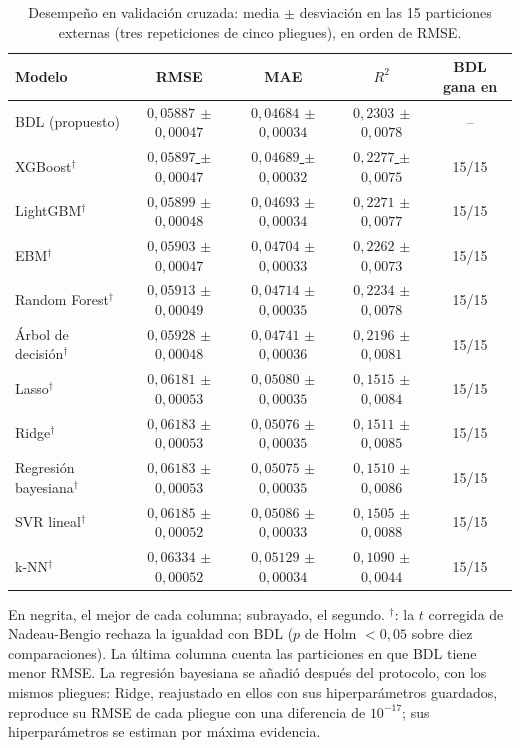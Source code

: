 \begin{table}[tbp]
  \centering\scriptsize\setlength{\tabcolsep}{4pt}
  \caption{Desempeño en validación cruzada: media $\pm$ desviación en las 15 particiones externas (tres repeticiones de cinco pliegues), en orden de RMSE.}
  \label{tab:desempeno}
  \begin{tabular}{lcccc}
    \toprule
    Modelo & RMSE & MAE & $R^2$ & BDL gana en \\
    \midrule
    BDL (propuesto) & {\boldmath\textbf{$0{,}05887$ $\pm$ $0{,}00047$}} & {\boldmath\textbf{$0{,}04684$ $\pm$ $0{,}00034$}} & {\boldmath\textbf{$0{,}2303$ $\pm$ $0{,}0078$}} & -- \\
    XGBoost$^\dagger$ & \underline{$0{,}05897$ $\pm$ $0{,}00047$} & \underline{$0{,}04689$ $\pm$ $0{,}00032$} & \underline{$0{,}2277$ $\pm$ $0{,}0075$} & 15/15 \\
    LightGBM$^\dagger$ & $0{,}05899$ $\pm$ $0{,}00048$ & $0{,}04693$ $\pm$ $0{,}00034$ & $0{,}2271$ $\pm$ $0{,}0077$ & 15/15 \\
    EBM$^\dagger$ & $0{,}05903$ $\pm$ $0{,}00047$ & $0{,}04704$ $\pm$ $0{,}00033$ & $0{,}2262$ $\pm$ $0{,}0073$ & 15/15 \\
    Random Forest$^\dagger$ & $0{,}05913$ $\pm$ $0{,}00049$ & $0{,}04714$ $\pm$ $0{,}00035$ & $0{,}2234$ $\pm$ $0{,}0078$ & 15/15 \\
    Árbol de decisión$^\dagger$ & $0{,}05928$ $\pm$ $0{,}00048$ & $0{,}04741$ $\pm$ $0{,}00036$ & $0{,}2196$ $\pm$ $0{,}0081$ & 15/15 \\
    Lasso$^\dagger$ & $0{,}06181$ $\pm$ $0{,}00053$ & $0{,}05080$ $\pm$ $0{,}00035$ & $0{,}1515$ $\pm$ $0{,}0084$ & 15/15 \\
    Ridge$^\dagger$ & $0{,}06183$ $\pm$ $0{,}00053$ & $0{,}05076$ $\pm$ $0{,}00035$ & $0{,}1511$ $\pm$ $0{,}0085$ & 15/15 \\
    Regresión bayesiana$^\dagger$ & $0{,}06183$ $\pm$ $0{,}00053$ & $0{,}05075$ $\pm$ $0{,}00035$ & $0{,}1510$ $\pm$ $0{,}0086$ & 15/15 \\
    SVR lineal$^\dagger$ & $0{,}06185$ $\pm$ $0{,}00052$ & $0{,}05086$ $\pm$ $0{,}00033$ & $0{,}1505$ $\pm$ $0{,}0088$ & 15/15 \\
    k-NN$^\dagger$ & $0{,}06334$ $\pm$ $0{,}00052$ & $0{,}05129$ $\pm$ $0{,}00034$ & $0{,}1090$ $\pm$ $0{,}0044$ & 15/15 \\
    \bottomrule
  \end{tabular}
  \par\smallskip\begin{minipage}{0.97\linewidth}\scriptsize En negrita, el mejor de cada columna; subrayado, el segundo. $^\dagger$: la $t$ corregida de Nadeau-Bengio rechaza la igualdad con BDL ($p$ de Holm $<0{,}05$ sobre diez comparaciones). La última columna cuenta las particiones en que BDL tiene menor RMSE. La regresión bayesiana se añadió después del protocolo, con los mismos pliegues: Ridge, reajustado en ellos con sus hiperparámetros guardados, reproduce su RMSE de cada pliegue con una diferencia de $10^{-17}$; sus hiperparámetros se estiman por máxima evidencia.\end{minipage}
\end{table}
